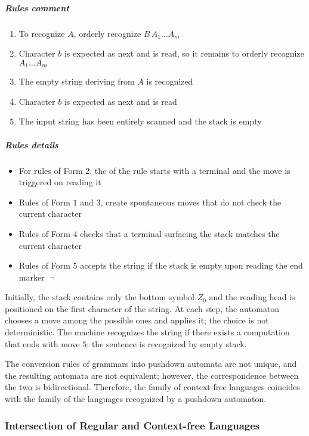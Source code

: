 \documentclass[english]{article}
\begin{document}
\subparagraph*{Rules comment}

\begin{enumerate}[label=\#\arabic*., labelindent=2em, leftmargin=*, widest*=2]
  \item To recognize \(A\), orderly recognize \(B \, A_1 \ldots A_m\)
  \item Character \(b\) is expected as next and is read, so it remains to orderly recognize \(A_1 \ldots A_m\)
  \item The empty string deriving from \(A\) is recognized
  \item Character \(b\) is expected as next and is read
  \item The input string has been entirely scanned and the stack is empty
\end{enumerate}

\subparagraph*{Rules details}

\begin{itemize}
  \item For rules of Form \(2\), the \RP of the rule starts with a terminal and the move is triggered on reading it
  \item Rules of Form \(1\) and \(3\), create spontaneous moves that do not check the current character
  \item Rules of Form \(4\) checks that a terminal surfacing the stack matches the current character
  \item Rules of Form \(5\) accepts the string if the stack is empty upon reading the end marker \(\dashv\)
\end{itemize}

Initially, the stack contains only the bottom symbol \(Z_0\) and the reading head is positioned on the first character of the string.
At each step, the automaton chooses a move among the possible ones and applies it; the choice is not deterministic.
The machine recognizes the string if there exists a computation that ends with move \(5\): the sentence is recognized by empty stack.

The conversion rules of grammars into pushdown automata are not unique, and the resulting automata are not equivalent;
however, the correspondence between the two is bidirectional.
Therefore, the family of context-free languages \CF coincides with the family of the languages recognized by a pushdown automaton.

\subsubsection{Intersection of Regular and Context-free Languages}
\label{sec:intersection-of-regular-and-context-free-languages}
\end{document}
